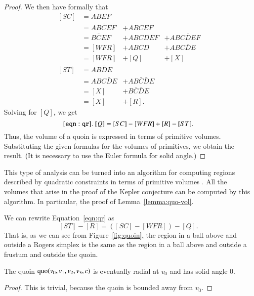 \begin{proof}
We then have formally that
$$
\begin{array}{lllll} \,[SC] &=  A B E F \\
     &= A B \bar C E F &+ A B C E F\\
     &= B \bar C E F &+ A B C D E F &+ A B C \bar D E F\\
     &= [WFR] &+ A B C D &+ A B C \bar D E\\
     &= [WFR] &+ [Q] &+ [X]\\ 
     \,[ST] &= A B \bar D E\\
     &= A B C \bar D E &+ A B \bar C \bar D E\\
     &= [X] &+ B \bar C \bar D E\\
     &= [X] &+ [R].
\end{array}
$$
Solving for $[Q]$, we get
\begin{equation}\tlabel{eqn:qr}
  [Q] = [SC] - [WFR] + [R] - [ST].
\end{equation}
Thus, the volume of a quoin is expressed in terms of primitive volumes.
Substituting the given formulas for the volumes of primitives, we obtain
the result.  (It is necessary to use the Euler formula for solid
angle.)
\end{proof}

\begin{remark}  This type of analysis can be turned into an algorithm
for computing regions described by quadratic constraints in terms
of primitive volumes \cite{quad}.  All the volumes that arise in the
proof of the Kepler conjecture can be computed by this algorithm.
In particular, the proof of Lemma~\ref{lemma:quo-vol}.
\end{remark}

\begin{remark}  
We can rewrite Equation~\ref{eqn:qr} as
$$
  [ST]-[R] = ([SC]-[WFR]) - [Q].
$$
That is, as we can see from Figure~\ref{fig:quoin}, the region
in a ball above and outside a Rogers simplex is the same as the
region in a ball above and outside a frustum and outside the quoin.
\end{remark}

\begin{lemma}  The quoin
$\operatorname{quo}(v_0,v_1,v_2,v_3,c)$ is eventually radial at $v_0$ and
has solid angle $0$.
\end{lemma}


\begin{proof}  This is trivial, because the quoin is bounded
away from $v_0$.
\end{proof} 

